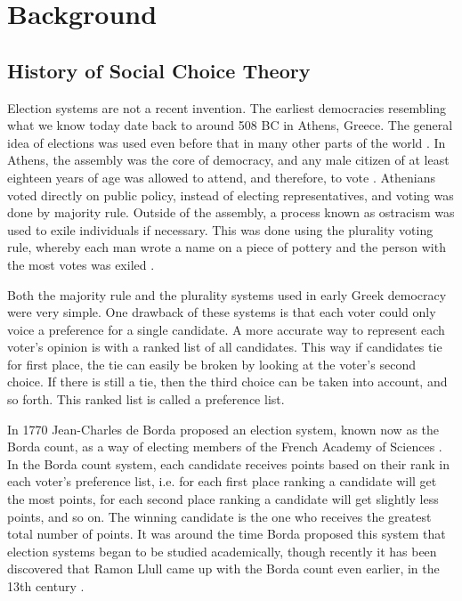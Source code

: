 
\chapter{Background}

\section{History of Social Choice Theory}

	Election systems are not a recent invention. The earliest democracies resembling what we know today date back to around 508 BC in Athens, Greece. The general idea of elections was used even before that in many other parts of the world \cite{democracybritannica}. In Athens, the assembly was the core of democracy, and any male citizen of at least eighteen years of age was allowed to attend, and therefore, to vote \cite{heinemann1952}. Athenians voted directly on public policy, instead of electing representatives, and voting was done by majority rule. Outside of the assembly, a process known as ostracism was used to exile individuals if necessary. This was done using the plurality voting rule, whereby each man wrote a name on a piece of pottery and the person with the most votes was exiled \cite{oturnbull}.

	Both the majority rule and the plurality systems used in early Greek democracy were very simple. One drawback of these systems is that each voter could only voice a preference for a single candidate. A more accurate way to represent each voter's opinion is with a ranked list of all candidates. This way if candidates tie for first place, the tie can easily be broken by looking at the voter's second choice. If there is still a tie, then the third choice can be taken into account, and so forth. This ranked list is called a preference list.

	In 1770 Jean-Charles de Borda proposed an election system, known now as the Borda count, as a way of electing members of the French Academy of Sciences \cite{borda1781mémoire}. In the Borda count system, each candidate receives points based on their rank in each voter's preference list, i.e. for each first place ranking a candidate will get the most points, for each second place ranking a candidate will get slightly less points, and so on. The winning candidate is the one who receives the greatest total number of points. It was around the time Borda proposed this system that election systems began to be studied academically, though recently it has been discovered that Ramon Llull came up with the Borda count even earlier, in the 13th century \cite{hägele2001llull}.

